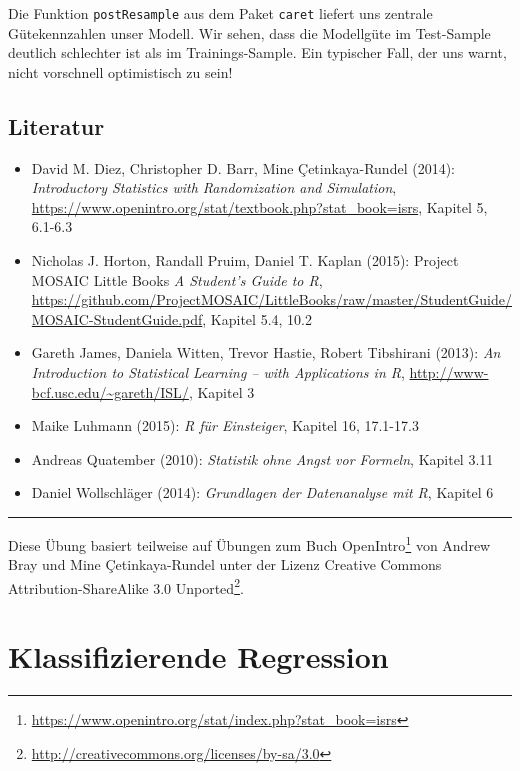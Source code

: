 \documentclass[12pt,]{book}
\providecommand{\tightlist}{%
  \setlength{\itemsep}{0pt}\setlength{\parskip}{0pt}}
\renewcommand{\href}[2]{#2\footnote{\url{#1}}}
\begin{document}
Die Funktion \texttt{postResample} aus dem Paket \texttt{caret} liefert
uns zentrale Gütekennzahlen unser Modell. Wir sehen, dass die Modellgüte
im Test-Sample deutlich schlechter ist als im Trainings-Sample. Ein
typischer Fall, der uns warnt, nicht vorschnell optimistisch zu sein!

\section{Literatur}\label{literatur}

\begin{itemize}
\tightlist
\item
  David M. Diez, Christopher D. Barr, Mine Çetinkaya-Rundel (2014):
  \emph{Introductory Statistics with Randomization and Simulation},
  \url{https://www.openintro.org/stat/textbook.php?stat_book=isrs},
  Kapitel 5, 6.1-6.3
\item
  Nicholas J. Horton, Randall Pruim, Daniel T. Kaplan (2015): Project
  MOSAIC Little Books \emph{A Student's Guide to R},
  \url{https://github.com/ProjectMOSAIC/LittleBooks/raw/master/StudentGuide/MOSAIC-StudentGuide.pdf},
  Kapitel 5.4, 10.2
\item
  Gareth James, Daniela Witten, Trevor Hastie, Robert Tibshirani (2013):
  \emph{An Introduction to Statistical Learning -- with Applications in
  R}, \url{http://www-bcf.usc.edu/~gareth/ISL/}, Kapitel 3
\item
  Maike Luhmann (2015): \emph{R für Einsteiger}, Kapitel 16, 17.1-17.3
\item
  Andreas Quatember (2010): \emph{Statistik ohne Angst vor Formeln},
  Kapitel 3.11
\item
  Daniel Wollschläger (2014): \emph{Grundlagen der Datenanalyse mit R},
  Kapitel 6
\end{itemize}

\begin{center}\rule{0.5\linewidth}{\linethickness}\end{center}

Diese Übung basiert teilweise auf Übungen zum Buch
\href{https://www.openintro.org/stat/index.php?stat_book=isrs}{OpenIntro}
von Andrew Bray und Mine Çetinkaya-Rundel unter der Lizenz
\href{http://creativecommons.org/licenses/by-sa/3.0}{Creative Commons
Attribution-ShareAlike 3.0 Unported}.

\chapter{Klassifizierende Regression}\label{klassifizierende-regression}
\end{document}
